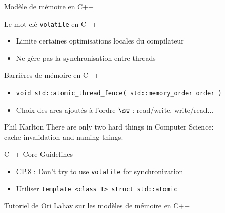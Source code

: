 
\begingroup

\begin{frame}[fragile]{Modèle de mémoire en C++}

  \vfill

  \begin{block}{Le mot-clé \lstinline{volatile} en C++}
    \begin{itemize}
    \item Limite certaines optimisations locales du compilateur
    \item \alert{Ne gère pas la synchronisation entre threads}
    \end{itemize}
  \end{block}

  \vfill

  \begin{block}{Barrières de mémoire en C++}
    \begin{itemize}
    \item \lstinline{void std::atomic_thread_fence( std::memory_order order )}
    \item Choix des arcs ajoutés à l'ordre $\sw$ : read/write, write/read...
    \end{itemize}
    \vspace{1mm}
    \begin{shadequote}{Phil Karlton}
      There are only two hard things in Computer Science: \\cache invalidation and naming things.
    \end{shadequote}
  \end{block}

  \vspace{-3mm}
  
  \begin{alertblock}{C++ Core Guidelines}
    \begin{itemize}
    \item \href{https://isocpp.github.io/CppCoreGuidelines/CppCoreGuidelines#Rconc-volatile}{\alert{CP.8 :} Don’t try to use \lstinline{volatile} for synchronization}
    \item Utiliser \lstinline{template <class T> struct std::atomic}
    \end{itemize}
  \end{alertblock}

  \vspace{-1mm}

  \begin{citing}
  \item Tutoriel de Ori Lahav sur les modèles de mémoire en C++
  \end{citing}

\end{frame}

\endgroup
\endinput
